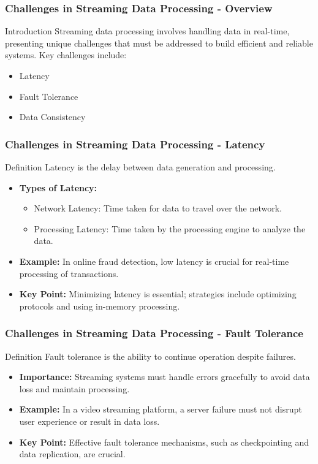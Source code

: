\documentclass[aspectratio=169]{beamer}
\begin{document}
\begin{frame}[fragile]
    \frametitle{Challenges in Streaming Data Processing - Overview}
    \begin{block}{Introduction}
        Streaming data processing involves handling data in real-time, presenting unique challenges that must be addressed to build efficient and reliable systems. Key challenges include:
    \end{block}
    \begin{itemize}
        \item Latency
        \item Fault Tolerance
        \item Data Consistency
    \end{itemize}
\end{frame}

\begin{frame}[fragile]
    \frametitle{Challenges in Streaming Data Processing - Latency}
    \begin{block}{Definition}
        Latency is the delay between data generation and processing.
    \end{block}
    \begin{itemize}
        \item \textbf{Types of Latency:}
        \begin{itemize}
            \item Network Latency: Time taken for data to travel over the network.
            \item Processing Latency: Time taken by the processing engine to analyze the data.
        \end{itemize}
        \item \textbf{Example:} In online fraud detection, low latency is crucial for real-time processing of transactions.
        \item \textbf{Key Point:} Minimizing latency is essential; strategies include optimizing protocols and using in-memory processing.
    \end{itemize}
\end{frame}

\begin{frame}[fragile]
    \frametitle{Challenges in Streaming Data Processing - Fault Tolerance}
    \begin{block}{Definition}
        Fault tolerance is the ability to continue operation despite failures.
    \end{block}
    \begin{itemize}
        \item \textbf{Importance:} Streaming systems must handle errors gracefully to avoid data loss and maintain processing.
        \item \textbf{Example:} In a video streaming platform, a server failure must not disrupt user experience or result in data loss.
        \item \textbf{Key Point:} Effective fault tolerance mechanisms, such as checkpointing and data replication, are crucial.
    \end{itemize}
\end{frame}
\end{document}
